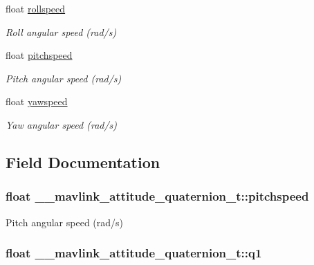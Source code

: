 \begin{DoxyCompactItemize}
float \hyperlink{struct____mavlink__attitude__quaternion__t_aa6ec530191df4da1f482533321684902}{rollspeed}
\begin{DoxyCompactList}\small\item\em Roll angular speed (rad/s) \end{DoxyCompactList}\item 
float \hyperlink{struct____mavlink__attitude__quaternion__t_ac77cd2999fca4230bf4fe7bcfe67c434}{pitchspeed}
\begin{DoxyCompactList}\small\item\em Pitch angular speed (rad/s) \end{DoxyCompactList}\item 
float \hyperlink{struct____mavlink__attitude__quaternion__t_a6e76b94100205e6f58df4232c1b4c32e}{yawspeed}
\begin{DoxyCompactList}\small\item\em Yaw angular speed (rad/s) \end{DoxyCompactList}\end{DoxyCompactItemize}


\subsection{Field Documentation}
\hypertarget{struct____mavlink__attitude__quaternion__t_ac77cd2999fca4230bf4fe7bcfe67c434}{
\subsubsection[{pitchspeed}]{\setlength{\rightskip}{0pt plus 5cm}float \+\_\+\+\_\+mavlink\+\_\+attitude\+\_\+quaternion\+\_\+t\+::pitchspeed}}\label{struct____mavlink__attitude__quaternion__t_ac77cd2999fca4230bf4fe7bcfe67c434}


Pitch angular speed (rad/s) 

\hypertarget{struct____mavlink__attitude__quaternion__t_a54fd7b1cca2ab5e1b800bef5c7014b17}{
\subsubsection[{q1}]{\setlength{\rightskip}{0pt plus 5cm}float \+\_\+\+\_\+mavlink\+\_\+attitude\+\_\+quaternion\+\_\+t\+::q1}}\label{struct____mavlink__attitude__quaternion__t_a54fd7b1cca2ab5e1b800bef5c7014b17}


